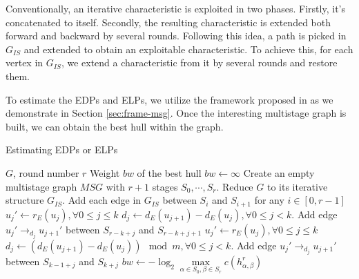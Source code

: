 Conventionally, an iterative characteristic is exploited in two phases. Firstly, it's concatenated to itself. Secondly, the resulting characteristic is extended both forward and backward by several rounds. Following this idea, a path is picked in $G_{IS}$ and extended to obtain an exploitable characteristic. To achieve this, for each vertex in $G_{IS}$, we extend a characteristic from it by several rounds and restore them.

To estimate the EDPs and ELPs, we utilize the framework proposed in \cite{EPRINT:HalVej18} as we demonstrate in Section \ref{sec:frame-msg}. Once the interesting multistage graph is built, we can obtain the best hull within the graph. 

\begin{algorithm}
	\caption{Estimating EDPs or ELPs}
	\label{algo:msg}
	\begin{algorithmic}[1]
        \Require $G$, round number $r$
        \Ensure Weight $bw$ of the best hull
        \Procedure {}{}
        \State $bw\leftarrow\infty$
        \State Create an empty multistage graph $MSG$ with $r+1$ stages $S_0,\cdots,S_r$.
        \State Reduce $G$ to its iterative structure $G_{IS}$. 
        \State Add each edge in $G_{IS}$ between $S_i$ and $S_{i+1}$ for any $i\in[0,r-1]$
        \State $u_j'\leftarrow r_E(u_j),\forall 0\leq j\leq k$
        \State $d_j\leftarrow d_E(u_{j+1})-d_E(u_j),\forall 0\leq j<k$.
        \State Add edge $u_j'\rightarrow_{d_j} u_{j+1}'$ between $S_{r-k+j}$ and $S_{r-k+j+1}$
        \EndFor
        \State $u_j'\leftarrow r_E(u_j),\forall 0\leq j\leq k$
        \State $d_j\leftarrow (d_E(u_{j+1})-d_E(u_j))\mod m,\forall 0\leq j<k$.
        \State Add edge $u_j'\rightarrow_{d_j} u_{j+1}'$ between $S_{k-1+j}$ and $S_{k+j}$
        \EndFor
        \State $bw\leftarrow-\log_2\max\limits_{\alpha\in S_0,\beta\in S_r}c(h^r_{\alpha,\beta})$
        \EndProcedure
	\end{algorithmic}
\end{algorithm}
